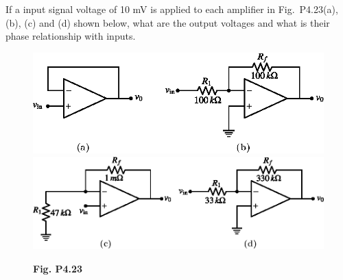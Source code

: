 \begin{problem}\label{prob4.23}
If a input signal voltage of 10 mV is applied to each amplifier in Fig.~P4.23(a), (b), (c) and (d) shown below, what are the output voltages and what is their phase relationship with inputs.
\begin{figure}[H]
\centering
\includegraphics{chap4/figP4.23ab.eps}

\bigskip
\smallskip

\includegraphics{chap4/figP4.23cd.eps}

\medskip
{\bf Fig. P4.23}
\end{figure}
\end{problem}

